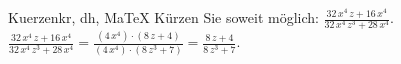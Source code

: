 \begin{MAufgabe}{Kuerzen}{kr, dh, MaTeX}
K\"urzen Sie soweit m\"oglich: $\frac{32\, x^4\, z + 16\, x^4}{32\, x^4\, z^3 + 28\, x^4}$.\\ 
\ifLsg\MLoesung
\quad $\frac{32\, x^4\, z + 16\, x^4}{32\, x^4\, z^3 + 28\, x^4}=\frac{(4\, x^4)\cdot(8\, z + 4)}{(4\, x^4)\cdot(8\, z^3 + 7)}=\frac{8\, z + 4}{8\, z^3 + 7}$.\else\relax\fi
 \end{MAufgabe}